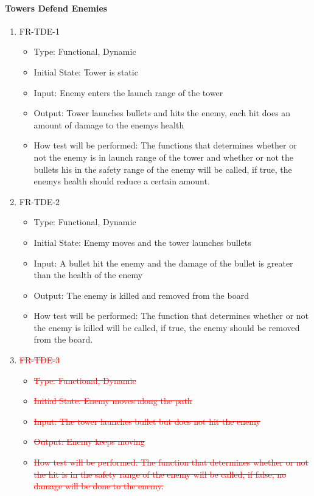 \documentclass[12,english]{article}
\begin{document}
\paragraph{Towers Defend Enemies}
\begin{enumerate}
  \item FR-TDE-1
  \begin{itemize}
      \item Type: Functional, Dynamic
      \item Initial State: Tower is static 
      \item Input: Enemy enters the launch range of the tower 
      \item Output: Tower launches bullets and hits the enemy, each hit does an amount of damage to the enemy\textcolor{red}{\textquotesingle}s health 
      \item How test will be performed: The functions that determines whether or not the enemy is in launch range of the tower and whether or not the bullets his in the safety range of the enemy will be called, if true, the enemy\textcolor{red}{\textquotesingle}s health should reduce a certain amount.
  \end{itemize}
  \item FR-TDE-2
  \begin{itemize}
      \item Type: Functional, Dynamic
      \item Initial State: Enemy moves and the tower launches bullets
      \item Input: A bullet hit the enemy and the damage of the bullet is greater than the health of the enemy 
      \item Output: The enemy is killed and removed from the board
      \item How test will be performed: The function that determines whether or not the enemy is killed will be called, if true, the enemy should be removed from the board. 
  \end{itemize}
  \item \textcolor{red}{\st{FR-TDE-3}}
  \begin{itemize}
      \item \textcolor{red}{\st{Type: Functional, Dynamic}}
      \item \textcolor{red}{\st{Initial State: Enemy moves along the path}}
      \item \textcolor{red}{\st{Input: The tower launches bullet but does not hit the enemy}}
      \item \textcolor{red}{\st{Output: Enemy keeps moving}}
      \item \textcolor{red}{\st{How test will be performed: The function that determines whether or not the hit is in the safety range of the enemy will be called, if false, no damage will be done to the enemy.}}
  \end{itemize}
\end{enumerate}
\end{document}
